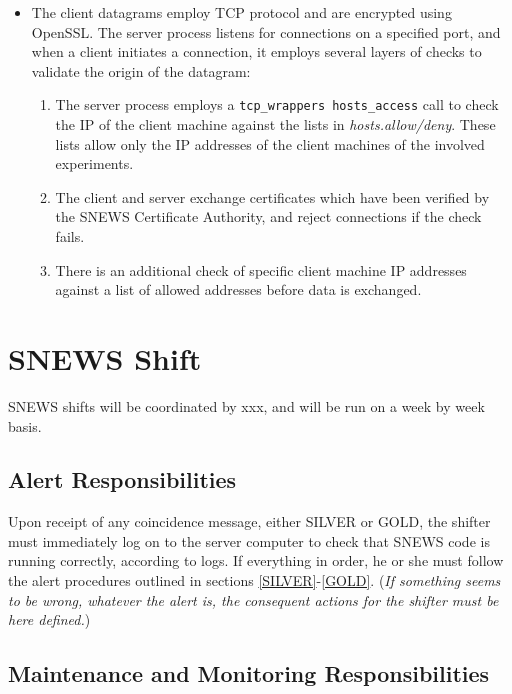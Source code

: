 \documentclass{article}
\begin{document}
\begin{itemize}
\item The client datagrams employ TCP protocol and 
are encrypted using OpenSSL.  
The server process listens for connections on a specified port,
and when a client initiates a connection, it employs several layers
of checks to validate the origin of the datagram:
\begin{enumerate}
\item The server process employs a {\tt tcp\_wrappers hosts\_access}
call to check the IP of the client machine against the lists in
{\it hosts.allow/deny}.  These lists allow only the IP addresses
of the client machines of the involved experiments.
\item
The client and server exchange certificates which have been
verified by the SNEWS Certificate Authority, and reject
connections if the check fails.
\item There is an additional check of specific client machine
IP addresses against a list of allowed addresses before data is exchanged.
\end{enumerate}
\end{itemize}

\section{SNEWS Shift}

SNEWS shifts will be coordinated by xxx, and will be run on
a week by week basis.  


\subsection{Alert Responsibilities}

Upon receipt of any coincidence message, either SILVER or GOLD, the
shifter must immediately log on to the server computer to check that
SNEWS code is running correctly, according to logs.  If everything
in order, he or she must follow
the alert procedures outlined in sections \ref{SILVER}-\ref{GOLD}.  ({\it If
something seems to be wrong, whatever the alert is, the consequent
actions for the shifter must be here defined.})

\subsection{Maintenance and Monitoring Responsibilities}
\end{document}
